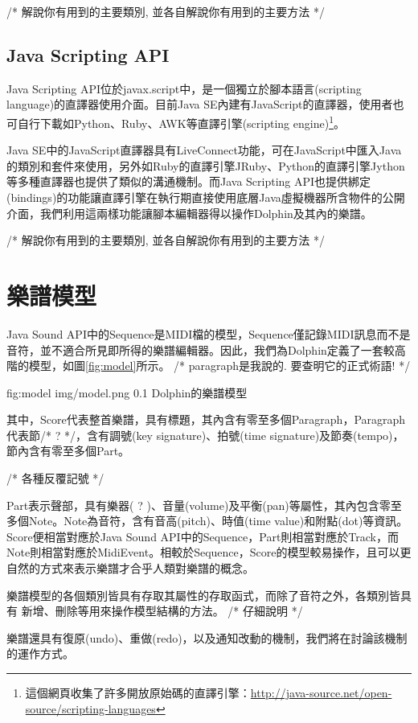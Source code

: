 \documentclass[12pt,a4paper,oneside]{report}
\begin{document}
/*
     解說你有用到的主要類別, 並各自解說你有用到的主要方法
*/

\subsection{Java Scripting API}

Java Scripting API位於javax.script中，是一個獨立於腳本語言(scripting language)的直譯器使用介面。目前Java SE內建有JavaScript的直譯器，使用者也可自行下載如Python、Ruby、AWK等直譯引擎(scripting engine)\footnote{這個網頁收集了許多開放原始碼的直譯引擎：\url{http://java-source.net/open-source/scripting-languages}}。

Java SE中的JavaScript直譯器具有LiveConnect功能，可在JavaScript中匯入Java的類別和套件來使用，另外如Ruby的直譯引擎JRuby、Python的直譯引擎Jython等多種直譯器也提供了類似的溝通機制。而Java Scripting API也提供綁定(bindings)的功能讓直譯引擎在執行期直接使用底層Java虛擬機器所含物件的公開介面，我們利用這兩樣功能讓腳本編輯器得以操作Dolphin及其內的樂譜。

/*
     解說你有用到的主要類別, 並各自解說你有用到的主要方法
*/


\section{樂譜模型}

Java Sound API中的Sequence是MIDI檔的模型，Sequence僅記錄MIDI訊息而不是音符，並不適合所見即所得的樂譜編輯器。因此，我們為Dolphin定義了一套較高階的模型，如圖\ref{fig:model}所示。 /* paragraph是我說的. 要查明它的正式術語! */

\figurewithcaption
{fig:model}
{img/model.png}
{0.1}
{Dolphin的樂譜模型}

其中，Score代表整首樂譜，具有標題，其內含有零至多個Paragraph，Paragraph代表節/* ? */，含有調號(key signature)、拍號(time signature)及節奏(tempo)，節內含有零至多個Part。

/* 各種反覆記號  */ 

Part表示聲部，具有樂器( ? )、音量(volume)及平衡(pan)等屬性，其內包含零至多個Note。Note為音符，含有音高(pitch)、時值(time value)和附點(dot)等資訊。Score便相當對應於Java Sound API中的Sequence，Part則相當對應於Track，而Note則相當對應於MidiEvent。相較於Sequence，Score的模型較易操作，且可以更自然的方式來表示樂譜才合乎人類對樂譜的概念。

樂譜模型的各個類別皆具有存取其屬性的存取函式，而除了音符之外，各類別皆具有
新增、刪除等用來操作模型結構的方法。 /*  
仔細說明  
*/

樂譜還具有復原(undo)、重做(redo)，以及通知改動的機制，我們將在討論該機制的運作方式。
\end{document}
